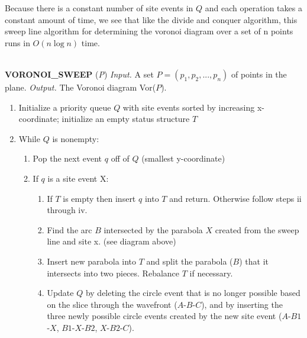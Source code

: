 Because there is a constant number of site events in $Q$ and each operation
takes a constant amount of time, we see that like the divide and conquer 
algorithm, this sweep line algorithm for determining the voronoi diagram 
over a set of n points runs in $O(n \log n)$ time.

\begin{center}
\end{center}

\parbox{4.5in}{
\hrulefill \\
{\bf VORONOI\_SWEEP} ({\sl P})\newline
{\sl Input.} A set $P=(p_1,p_2,...,p_n)$ of points in the plane.\newline
{\sl Output.} The Voronoi diagram Vor($P$).
\begin{enumerate}

\item Initialize a priority queue $Q$ with site events sorted by increasing
x-coordinate; initialize an empty status structure $T$

\item While $Q$ is nonempty:

\begin{enumerate}

\item Pop the next event $q$ off of $Q$ (smallest y-coordinate)

\item If $q$ is a site event X:

\begin{enumerate}

\item If $T$ is empty then insert $q$ into $T$ and return.  Otherwise
follow steps ii through iv.

\item Find the arc $B$ intersected by the parabola $X$ created from the 
sweep line and site x. (see diagram above)

\item Insert new parabola into $T$ and split the parabola ($B$) that it 
intersects into two pieces.  Rebalance $T$ if necessary.

\item Update $Q$ by deleting the circle event that is no longer possible based
on the slice through the wavefront ($A$-$B$-$C$), and by inserting the three 
newly possible circle events created by the new site event ($A$-$B1$-$X$, 
$B1$-$X$-$B2$, $X$-$B2$-$C$).


\end{enumerate}
\end{enumerate}
\end{enumerate}}
